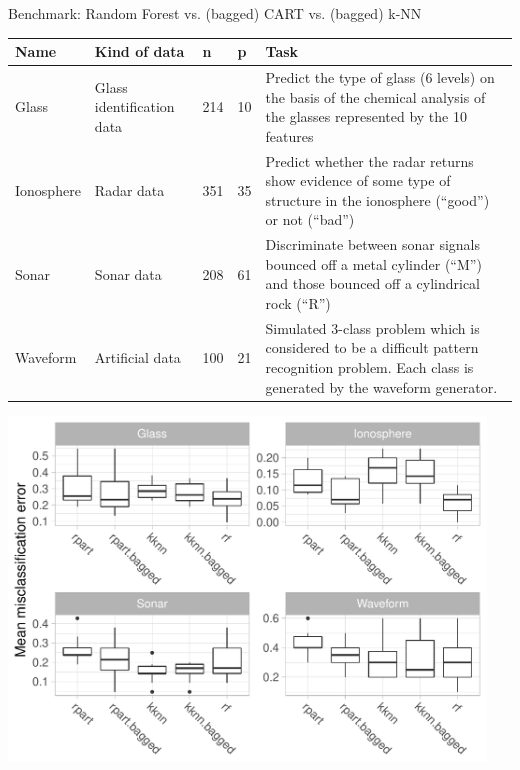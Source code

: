 \documentclass[11pt,compress,t,notes=noshow, xcolor=table]{beamer}
\begin{document}
\begin{vbframe}{Benchmark: Random Forest vs. (bagged) CART vs. (bagged) k-NN}
\begin{table}
\footnotesize
\begin{tabular}{p{1.5cm}p{2cm}p{0.5cm}p{0.5cm}p{5cm}}
Name & Kind of data &  n & p & Task\\
\hline
Glass & Glass identification data & 214 & 10 & Predict the type of glass (6 levels) on the basis of the chemical analysis of the glasses represented by the 10 features\\
Ionosphere & Radar data & 351 & 35 & Predict whether the radar returns show evidence of some type of structure in the ionosphere (\enquote{good}) or not (\enquote{bad}) \\
Sonar & Sonar data & 208 & 61 & Discriminate between sonar signals bounced off a metal cylinder (\enquote{M}) and those bounced off a cylindrical rock (\enquote{R})\\
Waveform & Artificial data & 100 & 21 & Simulated 3-class problem which is considered to be a difficult pattern recognition problem. Each class is generated by the waveform generator.\\
\hline
\end{tabular}
\end{table}

\framebreak

\begin{center}\includegraphics[width=0.95\textwidth]{figure_man/bm_stable_vs_unstable.pdf}\end{center}{}


\end{vbframe}
\end{document}
